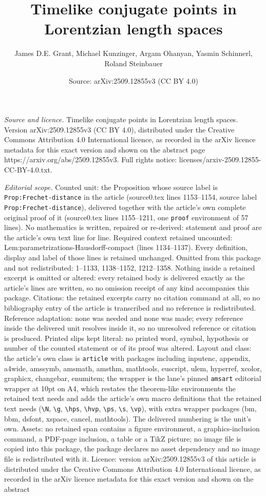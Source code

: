 \documentclass[10pt,a4paper]{amsart}
\title[Timelike conjugate points in Lorentzian length spaces]{Timelike conjugate points in Lorentzian length spaces}
\author{James D.E. Grant, Michael Kunzinger, Argam Ohanyan, Yasmin Schinnerl, Roland Steinbauer}
\date{Source: arXiv:2509.12855v3 (CC BY 4.0)}
\begin{document}
\maketitle

\noindent\emph{Source and licence.} Timelike conjugate points in Lorentzian length spaces. Version arXiv:2509.12855v3 (CC BY 4.0), distributed under the Creative Commons Attribution 4.0 International licence, as recorded in the arXiv licence metadata for this exact version and shown on the abstract page https://arxiv.org/abs/2509.12855v3. Full rights notice: licenses/arxiv-2509.12855-CC-BY-4.0.txt.\par\smallskip

\noindent\textit{Editorial scope.} Counted unit: the Proposition whose source label is \texttt{Prop:Frechet-distance} in the article (source0.tex lines 1153--1154, source label \texttt{Prop:Frechet-distance}), delivered together with the article's own complete original proof of it (source0.tex lines 1155--1211, one \texttt{proof} environment of 57 lines). No mathematics is written, repaired or re-derived: statement and proof are the article's own text line for line. Required context retained uncounted: Lem:parametrizations-Hausdorff-compact (lines 1134--1137). Every definition, display and label of those lines is retained unchanged. Omitted from this package and not redistributed: 1--1133, 1138--1152, 1212--1358. Nothing inside a retained excerpt is omitted or altered: every retained body is delivered exactly as the article's lines are written, so no omission receipt of any kind accompanies this package. Citations: the retained excerpts carry no citation command at all, so no bibliography entry of the article is transcribed and no reference is redistributed. Reference adaptation: none was needed and none was made; every reference inside the delivered unit resolves inside it, so no unresolved reference or citation is produced. Printed slips kept literal: no printed word, symbol, hypothesis or number of the counted statement or of its proof was altered. Layout and class: the article's own class is \texttt{article} with packages including inputenc, appendix, a4wide, amssymb, amsmath, amsthm, mathtools, euscript, ulem, hyperref, xcolor, graphicx, changebar, enumitem; the wrapper is the lane's pinned \texttt{amsart} editorial wrapper at 10pt on A4, which restates the theorem-like environments the retained text needs and adds the article's own macro definitions that the retained text needs (\texttt{\textbackslash N}, \texttt{\textbackslash g}, \texttt{\textbackslash hps}, \texttt{\textbackslash hvp}, \texttt{\textbackslash ps}, \texttt{\textbackslash s}, \texttt{\textbackslash vp}), with extra wrapper packages (bm, bbm, dsfont, xspace, cancel, mathtools). The delivered numbering is the unit's own. Assets: no retained span contains a figure environment, a graphics-inclusion command, a PDF-page inclusion, a table or a TikZ picture; no image file is copied into this package, the package declares no asset dependency and no image file is redistributed with it. Licence: version arXiv:2509.12855v3 of this article is distributed under the Creative Commons Attribution 4.0 International licence, as recorded in the arXiv licence metadata for this exact version and shown on the abstract 
\end{document}
